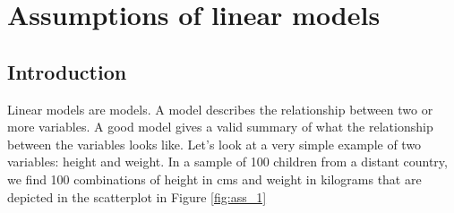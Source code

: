 \chapter{Assumptions of linear models}\label{chap:assumptions}


\section{Introduction}
Linear models are models. A model describes the relationship between two or more variables. A good model gives a valid summary of what the relationship between the variables looks like. Let's look at a very simple example of two variables: height and weight. In a sample of 100 children from a distant country, we find 100 combinations of height in cms and weight in kilograms that are depicted in the scatterplot in Figure \ref{fig:ass_1}

\begin{knitrout}
\color{fgcolor}\begin{kframe}


{\ttfamily\noindent\bfseries{}}

{\ttfamily\noindent\bfseries{}}\end{kframe}
\end{knitrout}













































